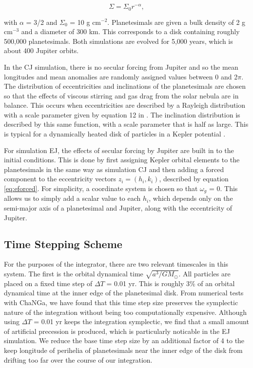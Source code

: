 \documentclass[twocolumn]{aastex63}
\begin{document}
\begin{equation}\label{eq:surf_den}
	\Sigma = \Sigma_{0} r^{-\alpha},
\end{equation}

\noindent with $\alpha$ = 3/2 and $\Sigma_{0}$ = 10 g cm$^{-2}$. Planetesimals are given a bulk density of 2 g cm$^{-3}$ and a 
diameter of 300 km. This corresponds to a disk containing roughly 500,000 planetesimals. Both simulations are evolved for 
5,000 years, which is about 400 Jupiter orbits.

In the CJ simulation, there is no secular forcing from Jupiter and so the mean longitudes and mean anomalies are randomly 
assigned values between 0 and 2$\pi$. The distribution of eccentricities and inclinations of the planetesimals are chosen so that the 
effects of viscous stirring and gas drag from the solar nebula are in balance. This occurs when eccentricities are described by a 
Rayleigh distribution with a scale parameter given by equation 12 in \citet{2002ApJ...581..666K}. The inclination distribution is 
described by this same function, with a scale parameter that is half as large. This is typical for a dynamically heated disk 
of particles in a Kepler potential \citep{1993MNRAS.263..875I}.

For simulation EJ, the effects of secular forcing by Jupiter are built in to the initial conditions. This is done by first assigning Kepler 
orbital elements to the planetesimals in the same way as simulation CJ and then adding a forced component to the eccentricity 
vectors $z_{i} = \left( h_{i}, k_{i} \right)$, described by equation \ref{eq:eforced}. For simplicity, a coordinate system is chosen so that 
$\omega_{g}$ = 0. This allows us to simply add a scalar value to each $h_{i}$, which depends only on the semi-major axis of a 
planetesimal and Jupiter, along with the eccentricity of Jupiter.

\subsection{Time Stepping Scheme}\label{sec:timestep}

For the purposes of the integrator, there are two relevant timescales in this system. The first is the orbital dynamical time $\sqrt{a^3/
G M_{\odot}}$. All particles are placed on a fixed time step of $\Delta T$ = 0.01 yr. This is roughly 3\% of an orbital dynamical time at 
the inner edge of the planetesimal disk. From numerical tests with {\sc ChaNGa}, we have found that this time step size preserves 
the symplectic nature of the integration without being too computationally expensive. Although using $\Delta T$ = 0.01 yr keeps the 
integration symplectic, we find that a small amount of artificial precession is produced, which is particularly noticable in the EJ 
simulation. We reduce the base time step size by an additional factor of 4 to the keep longitude of perihelia of planetesimals near the 
inner edge of the disk from drifting too far over the course of our integration.
\end{document}
